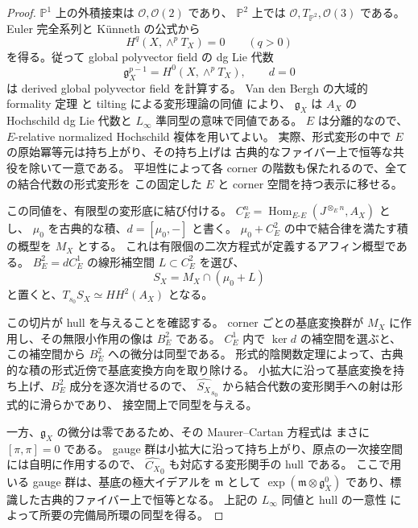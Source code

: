 \begin{proof}
$\mathbb P^1$ 上の外積接束は $\mathcal O,\mathcal O(2)$ であり、
$\mathbb P^2$ 上では $\mathcal O,T_{\mathbb P^2},\mathcal O(3)$ である。
Euler 完全系列と K\"unneth の公式から
\[
 H^q(X,\wedge^pT_X)=0\qquad(q>0)
\]
を得る。従って global polyvector field の dg Lie 代数
\[
 \mathfrak g_X^{p-1}=H^0(X,\wedge^pT_X),\qquad d=0
\]
は derived global polyvector field を計算する。
Van den Bergh の大域的 formality 定理
\cite[定理1.1および式(1.3)]{VdBGlobal} と tilting による変形理論の同値
\cite[定理3.18、命題3.21]{BW2024} により、
$\mathfrak g_X$ は $A_X$ の Hochschild dg Lie 代数と $L_\infty$ 準同型の意味で同値である。
$E$ は分離的なので、$E$-relative normalized Hochschild 複体を用いてよい。
実際、形式変形の中で $E$ の原始冪等元は持ち上がり、その持ち上げは
古典的なファイバー上で恒等な共役を除いて一意である。
平坦性によって各 corner の階数も保たれるので、全ての結合代数の形式変形を
この固定した $E$ と corner 空間を持つ表示に移せる。

この同値を、有限型の変形底に結び付ける。
$C_E^n=\operatorname{Hom}_{E\text{-}E}(J^{\otimes_E n},A_X)$ とし、
$\mu_0$ を古典的な積、$d=[\mu_0,-]$ と書く。
$\mu_0+C_E^2$ の中で結合律を満たす積の概型を $M_X$ とする。
これは有限個の二次方程式が定義するアフィン概型である。
$B_E^2=dC_E^1$ の線形補空間 $L\subset C_E^2$ を選び、
\[
 S_X=M_X\cap(\mu_0+L)
\]
と置くと、$T_{s_0}S_X\simeq HH^2(A_X)$ となる。

この切片が hull を与えることを確認する。
corner ごとの基底変換群が $M_X$ に作用し、その無限小作用の像は $B_E^2$ である。
$C_E^1$ 内で $\ker d$ の補空間を選ぶと、この補空間から $B_E^2$ への微分は同型である。
形式的陰関数定理によって、古典的な積の形式近傍で基底変換方向を取り除ける。
小拡大に沿って基底変換を持ち上げ、$B_E^2$ 成分を逐次消せるので、
$\widehat{S_X}_{s_0}$ から結合代数の変形関手への射は形式的に滑らかであり、
接空間上で同型を与える。

一方、$\mathfrak g_X$ の微分は零であるため、その Maurer--Cartan 方程式は
まさに $[\pi,\pi]=0$ である。
gauge 群は小拡大に沿って持ち上がり、原点の一次接空間には自明に作用するので、
$\widehat{C_X}_0$ も対応する変形関手の hull である。
ここで用いる gauge 群は、基底の極大イデアルを $\mathfrak m$ として
$\exp(\mathfrak m\otimes\mathfrak g_X^0)$ であり、標識した古典的ファイバー上で恒等となる。
上記の $L_\infty$ 同値と hull の一意性
\cite[命題2.9]{Schlessinger} によって所要の完備局所環の同型を得る。
\end{proof}

